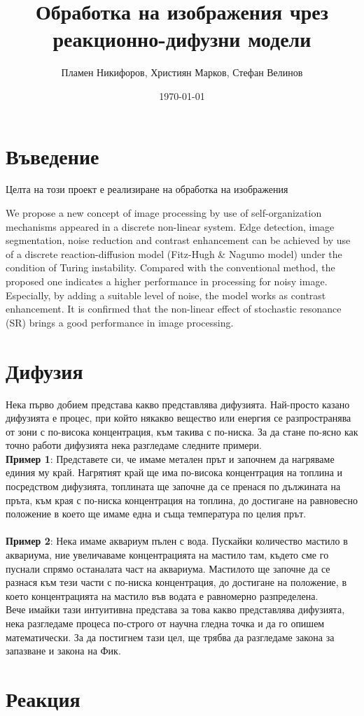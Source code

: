\documentclass[12pt,leqn]{article}
\title{Обработка на изображения чрез реакционно-дифузни модели}
\author{Пламен Никифоров, Християн Марков, Стефан Велинов}
\date{\today}
\begin{document}
\maketitle

\tableofcontents

\section{Въведение}

Целта на този проект е реализиране на обработка на изображения

We propose a new concept of image processing by use
of self-organization mechanisms appeared in a discrete
non-linear system. Edge detection, image segmentation,
noise reduction and contrast enhancement can be achieved
by use of a discrete reaction-diffusion model (Fitz-Hugh
& Nagumo model) under the condition of Turing
instability. Compared with the conventional method, the
proposed one indicates a higher performance in
processing for noisy image. Especially, by adding a
suitable level of noise, the model works as contrast
enhancement. It is confirmed that the non-linear effect of
stochastic resonance (SR) brings a good performance in
image processing. 

\section{Дифузия}
Нека първо добием представа какво представлява дифузията. Най-просто казано дифузията е
процес, при който някакво вещество или енергия се разпространява от зони с по-висока концентрация,
към такива с по-ниска. За да стане по-ясно как точно работи дифузията нека разгледаме
следните примери.\\

\textbf{Пример 1}: Представете си, че имаме метален прът и започнем да нагряваме
единия му край. Нагрятият край ще има по-висока концентрация на топлина и посредством дифузията, топлината
ще започне да се пренася по дължината на пръта, към края с по-ниска концентрация на топлина, до достигане на равновесно положение в което ще имаме една и съща температура по целия прът.\\\\

\textbf{Пример 2}: Нека имаме аквариум пълен с вода. Пускайки количество мастило в аквариума, ние увеличаваме концентрацията на мастило там, където сме го пуснали спрямо останалата част на аквариума. Мастилото ще започне да се разнася към тези части с по-ниска концентрация, до достигане на положение, в което концентрацията на мастило във водата е равномерно разпределена.\\

Вече имайки тази интуитивна представа за това какво представлява дифузията, нека разгледаме процеса по-строго от научна гледна точка и да го опишем математически. За да постигнем тази цел, ще трябва да разгледаме закона за запазване и закона на Фик.

\section{Реакция}
\end{document}
